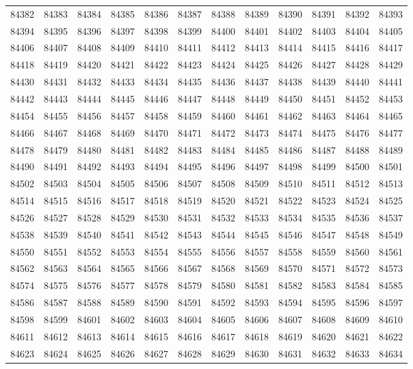 \begin{center}
\begin{longtable}{llllllllllll}
84382 &84383 &84384 &84385 &84386 &84387 &84388 &84389 &84390 &84391 &84392 &84393 \\
84394 &84395 &84396 &84397 &84398 &84399 &84400 &84401 &84402 &84403 &84404 &84405 \\
84406 &84407 &84408 &84409 &84410 &84411 &84412 &84413 &84414 &84415 &84416 &84417 \\
84418 &84419 &84420 &84421 &84422 &84423 &84424 &84425 &84426 &84427 &84428 &84429 \\
84430 &84431 &84432 &84433 &84434 &84435 &84436 &84437 &84438 &84439 &84440 &84441 \\
84442 &84443 &84444 &84445 &84446 &84447 &84448 &84449 &84450 &84451 &84452 &84453 \\
84454 &84455 &84456 &84457 &84458 &84459 &84460 &84461 &84462 &84463 &84464 &84465 \\
84466 &84467 &84468 &84469 &84470 &84471 &84472 &84473 &84474 &84475 &84476 &84477 \\
84478 &84479 &84480 &84481 &84482 &84483 &84484 &84485 &84486 &84487 &84488 &84489 \\
84490 &84491 &84492 &84493 &84494 &84495 &84496 &84497 &84498 &84499 &84500 &84501 \\
84502 &84503 &84504 &84505 &84506 &84507 &84508 &84509 &84510 &84511 &84512 &84513 \\
84514 &84515 &84516 &84517 &84518 &84519 &84520 &84521 &84522 &84523 &84524 &84525 \\
84526 &84527 &84528 &84529 &84530 &84531 &84532 &84533 &84534 &84535 &84536 &84537 \\
84538 &84539 &84540 &84541 &84542 &84543 &84544 &84545 &84546 &84547 &84548 &84549 \\
84550 &84551 &84552 &84553 &84554 &84555 &84556 &84557 &84558 &84559 &84560 &84561 \\
84562 &84563 &84564 &84565 &84566 &84567 &84568 &84569 &84570 &84571 &84572 &84573 \\
84574 &84575 &84576 &84577 &84578 &84579 &84580 &84581 &84582 &84583 &84584 &84585 \\
84586 &84587 &84588 &84589 &84590 &84591 &84592 &84593 &84594 &84595 &84596 &84597 \\
84598 &84599 &84601 &84602 &84603 &84604 &84605 &84606 &84607 &84608 &84609 &84610 \\
84611 &84612 &84613 &84614 &84615 &84616 &84617 &84618 &84619 &84620 &84621 &84622 \\
84623 &84624 &84625 &84626 &84627 &84628 &84629 &84630 &84631 &84632 &84633 &84634 \\

\end{longtable}
\end{center}
